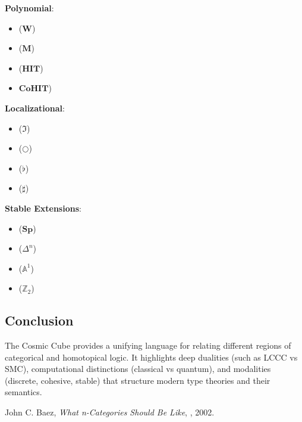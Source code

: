 \documentclass{article}
\begin{document}
\noindent \textbf{Polynomial}:
\begin{itemize}
\item {} ($\mathbf{W}$)
\item {} ($\mathbf{M}$)
\item {} ($\mathbf{HIT}$)
\item {} $\mathbf{CoHIT}$)
\end{itemize}

\noindent \textbf{Localizational}:
\begin{itemize}
\item {} ($\Im$)
\item {} ($\bigcirc$)
\item {} ($\flat$)
\item {} ($\sharp$)
\end{itemize}

\noindent \textbf{Stable Extensions}:
\begin{itemize}
\item {} ($\mathbf{Sp}$)
\item {} ($\mathbb{\Delta}^n$)
\item {} ($\mathbb{A}^1$)
\item {} ($\mathbb{Z}_2$)
\end{itemize}

\subsection{Conclusion}
The Cosmic Cube provides a unifying language for relating different regions
of categorical and homotopical logic. It highlights deep dualities (such as
LCCC vs SMC), computational distinctions (classical vs quantum),
and modalities (discrete, cohesive, stable) that structure modern
type theories and their semantics.

\begin{thebibliography}{9}
 John C. Baez, \emph{What n-Categories Should Be Like}, , 2002.
\end{thebibliography}
\end{document}
